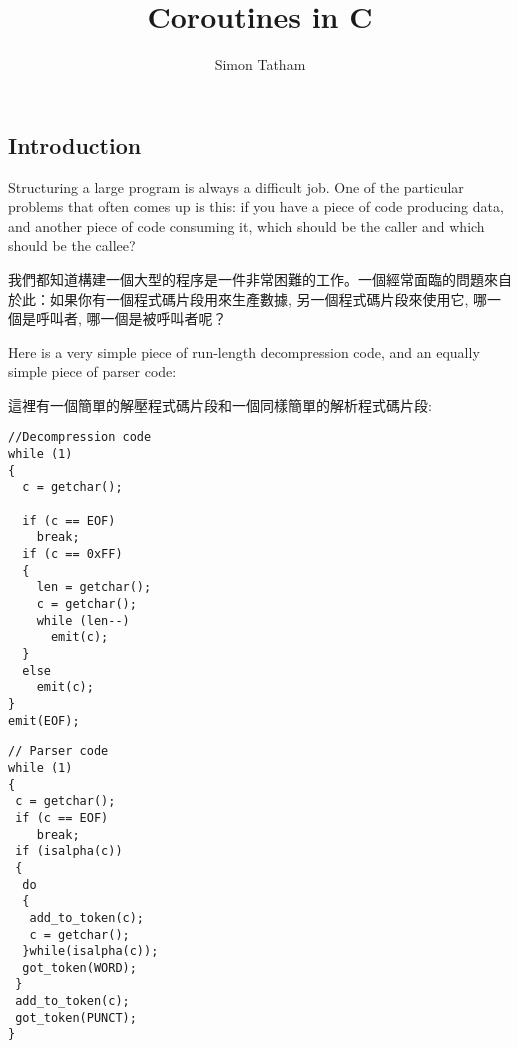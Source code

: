\documentclass[12pt]{article}
\title{Coroutines in C}
\author{Simon Tatham}
\begin{document}
\maketitle

%

\newpage
\tableofcontents
\newpage

\begin{CJK}{UTF8}{bsmi} %

\section{Introduction}

 Structuring a large program is always a difficult job. One of the particular problems that often comes up is this: if you have a piece of code producing data, and another piece of code consuming it, which should be the caller and which should be the callee?

我們都知道構建一個大型的程序是一件非常困難的工作。一個經常面臨的問題來自於此：如果你有一個程式碼片段用來生產數據, 另一個程式碼片段來使用它, 哪一個是呼叫者, 哪一個是被呼叫者呢？

 Here is a very simple piece of run-length decompression code, and an equally simple piece of parser code: 


這裡有一個簡單的解壓程式碼片段和一個同樣簡單的解析程式碼片段: 

\newpage
\begin{multicols}{2}

\begin{lstlisting}[caption=decompression, basicstyle=\footnotesize, breaklines=true, frame=single,frameround=tttt]
//Decompression code
while (1) 
{
  c = getchar();

  if (c == EOF)
    break;
  if (c == 0xFF) 
  {
    len = getchar();
    c = getchar();
    while (len--)
      emit(c);
  } 
  else
    emit(c);
}
emit(EOF);
\end{lstlisting}

\begin{lstlisting}[caption=parser, basicstyle=\footnotesize, breaklines=true, frame=single,frameround=tttt]
// Parser code 
while (1) 
{
 c = getchar();
 if (c == EOF)
    break;
 if (isalpha(c)) 
 {
  do 
  {
   add_to_token(c);
   c = getchar();
  }while(isalpha(c));
  got_token(WORD);
 }
 add_to_token(c);
 got_token(PUNCT);
}


\end{lstlisting}
\end{multicols}
\end{CJK}
\end{document}
